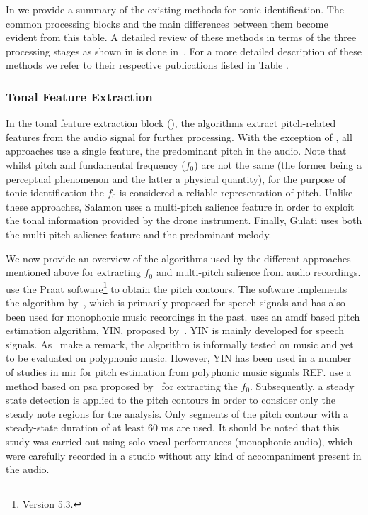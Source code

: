 {	
In  we provide a summary of the existing methods for tonic identification. The common processing blocks and the main differences between them become evident from this table. A detailed review of these methods in terms of the three processing stages as shown in  is done in~\cite{Gulati2014Tonic}. For a more detailed description of these methods we refer to their respective publications listed in Table . 


\subsubsection{Tonal Feature Extraction}
\label{Feature Extraction}

In the tonal feature extraction block (), the algorithms extract pitch-related
features from the audio signal for further processing. With the exception of \cite{SalamonSankalp2012,SGulatiIstanbul2012}, all approaches use a single feature, the predominant pitch in the audio. Note that whilst pitch and fundamental frequency ($f_0$) are not the same (the former being a perceptual phenomenon and the latter a physical quantity), for the purpose of tonic identification the $f_0$ is considered a reliable representation of pitch. Unlike these approaches, Salamon \cite{SalamonSankalp2012} uses a multi-pitch salience feature in order to exploit the tonal information provided by the drone instrument. Finally, Gulati \cite{SGulatiIstanbul2012} uses both the multi-pitch salience feature and the predominant melody. 

We now provide an overview of the algorithms used by the different approaches mentioned above for extracting $f_0$ and multi-pitch salience from audio recordings. \cite{ranjani2011carnatic} use the Praat software\footnote{Version 5.3.} \cite{BoersmaPaul2001} to obtain the pitch contours. The software implements the algorithm by~\cite{boersma1993accurate}, which is primarily proposed for speech signals and has also been used for monophonic music recordings in the past. \cite{Ashwin_Istanbul2012} uses an \gls{amdf} based pitch estimation algorithm, YIN, proposed by~\cite{DeCheveigne2002}. YIN is mainly developed for speech signals. As~\cite{DeCheveigne2002} make a remark,  the algorithm is informally tested on music and yet to be evaluated on polyphonic music. However, YIN has been used in a number of studies in \gls{mir} for pitch estimation from polyphonic music signals REF. \cite{Sengupta2005b} use a method based on \gls{psa} proposed by~\cite{AKDatta_1996} for extracting the $f_0$. Subsequently, a steady state detection is applied to the pitch contours in order to consider only the steady note regions for the analysis. Only segments of the pitch contour with a steady-state duration of at least 60 ms are used. It should be noted that this study was carried out using solo vocal performances (monophonic audio), which were carefully recorded in a studio without any kind of accompaniment present in the audio.

}
